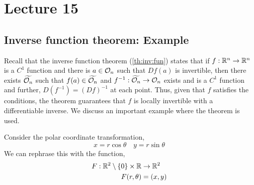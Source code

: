 \documentclass[../Analysis-3.tex]{subfiles}
\begin{document}
\chapter*{Lecture 15} %
\setcounter{chapter}{15} %
\setcounter{section}{0}

\section{Inverse function theorem: Example}

Recall that the inverse function theorem (\ref{th:inv:fun}) states that if \( f: \mathbb{R}^n \to \mathbb{R}^n  \) is a \( C^1 \) function and there is \( a \in \mathcal{O}_{n} \) such that \( Df(a) \) is invertible, then there exists \( \widetilde{\mathcal{O}_{n}} \) such that \( f(a) \in \widetilde{\mathcal{O}_{n}} \) and \( f^{-1}: \widetilde{\mathcal{O}_{n}} \to \mathcal{O}_{n} \) exists and is a \( C^1 \) function and further, \( D(f^{-1}) = (Df)^{-1} \) at each point. Thus, given that \( f \) satisfies the conditions, the theorem guarantees that \( f \) is locally invertible with a differentiable inverse. We discuss an important example where the theorem is used.
\smallskip

Consider the polar coordinate transformation,
\[ 
 x = r \cos \theta \quad y = r \sin \theta 
 \]
We can rephrase this with the function,
\begin{align*}
   F: \mathbb{R}^2 \setminus \{0\} \times \mathbb{R} &\to \mathbb{R}^2 \\
   F(r, \theta) &= (x,y)
\end{align*}
\end{document}
